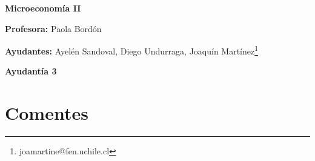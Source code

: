 \documentclass{exam}
\renewcommand{\thefootnote}{\fnsymbol{footnote}}
\begin{document}
\begin{center}

\LARGE{\textbf{Microeconomía II}}

\medskip
\normalsize \textbf{Profesora:} Paola Bordón

\normalsize \textbf{Ayudantes:} Ayelén Sandoval, Diego Undurraga, Joaquín Martínez\footnote[2]{joamartine@fen.uchile.cl}


\medskip
\large{\textbf{Ayudantía 3}}

\end{center}

\tableofcontents

\renewcommand{\thefootnote}{\Roman{footnote}}

\section{Comentes}
\end{document}
